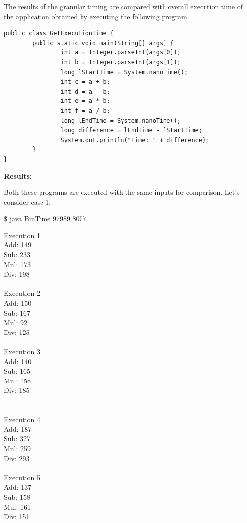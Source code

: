\documentclass[11pt]{article}
\begin{document}
The results of the granular timing are compared with overall execution time of the application obtained by executing the following program.

\singlespacing
\begin{lstlisting}
public class GetExecutionTime {
        public static void main(String[] args) {
                int a = Integer.parseInt(args[0]);
                int b = Integer.parseInt(args[1]);
                long lStartTime = System.nanoTime();
                int c = a + b;
                int d = a - b;
                int e = a * b;
                int f = a / b;
                long lEndTime = System.nanoTime();
                long difference = lEndTime - lStartTime;
                System.out.println("Time: " + difference);
        }
}
\end{lstlisting}

\textbf{Results:}

Both these programs are executed with the same inputs for comparison. Let's consider case 1: 

\$ java BinTime 97989 8007

Execution 1: \\
Add: 149\\
Sub: 233\\
Mul: 173\\
Div: 198\\
\\Execution 2:\\
Add: 150\\
Sub: 167\\
Mul: 92\\
Div: 125\\
\\Execution 3:\\
Add: 140\\
Sub: 165\\
Mul: 158\\
Div: 185\\
\\\\Execution 4:\\
Add: 187\\
Sub: 327\\
Mul: 259\\
Div: 293\\
\\Execution 5:\\
Add: 137\\
Sub: 158\\
Mul: 161\\
Div: 151\\
\end{document}
